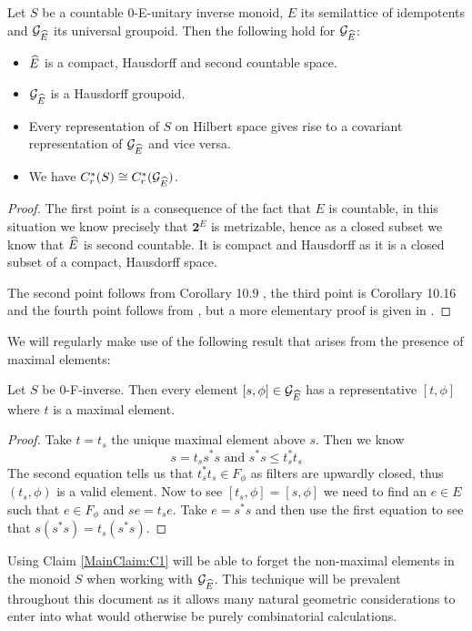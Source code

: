 \begin{theorem}\label{Thm:Info}
Let $S$ be a countable 0-E-unitary inverse monoid, $E$ its semilattice of idempotents and $\mathcal{G}_{\widehat{E}}$ its universal groupoid. Then the following hold for $\mathcal{G}_{\widehat{E}}$:
\begin{itemize}
\item $\widehat{E}$ is a compact, Hausdorff and second countable space.
\item $\mathcal{G}_{\widehat{E}}$ is a Hausdorff groupoid.
\item Every representation of $S$ on Hilbert space gives rise to a covariant representation of $\mathcal{G}_{\widehat{E}}$ and vice versa.
\item We have $C^{*}_{r}(S) \cong C^{*}_{r}(\mathcal{G}_{\widehat{E}})$.
\end{itemize}
\end{theorem}
\begin{proof}
The first point is a consequence of the fact that $E$ is countable, in this situation we know precisely that $\textbf{2}^{E}$ is metrizable, hence as a closed subset we know that $\widehat{E}$ is second countable. It is compact and Hausdorff as it is a closed subset of a compact, Hausdorff space.

The second point follows from Corollary 10.9 \cite{MR2419901}, the third point is Corollary 10.16 \cite{MR2419901} and the fourth point follows from \cite{MR1724106}, but a more elementary proof is given in \cite{MR1900993}.
\end{proof}

We will regularly make use of the following result that arises from the presence of maximal elements:

\begin{claim}\label{MainClaim:C1}
Let $S$ be 0-F-inverse. Then every element $[s,\phi] \in \mathcal{G}_{\widehat{E}}$ has a representative $[t,\phi]$ where $t$ is a maximal element.
\end{claim}
\begin{proof}
Take $t=t_{s}$ the unique maximal element above $s$. Then we know 
\begin{equation*}
s = t_{s}s^{*}s \mbox{ and } s^{*}s \leq t_{s}^{*}t_{s}
\end{equation*} 
The second equation tells us that $t_{s}^{*}t_{s} \in F_{\phi}$ as filters are upwardly closed, thus $(t_{s},\phi)$ is a valid element. Now to see $[t_{s},\phi]=[s,\phi]$ we need to find an $e \in E$ such that $e \in F_{\phi}$ and $se=t_{s}e$. Take $e=s^{*}s$ and then use the first equation to see that $s(s^{*}s)=t_{s}(s^{*}s)$.
\end{proof}
Using Claim \ref{MainClaim:C1} will be able to forget the non-maximal elements in the monoid $S$ when working with $\mathcal{G}_{\widehat{E}}$. This technique will be prevalent throughout this document as it allows many natural geometric considerations to enter into what would otherwise be purely combinatorial calculations.

